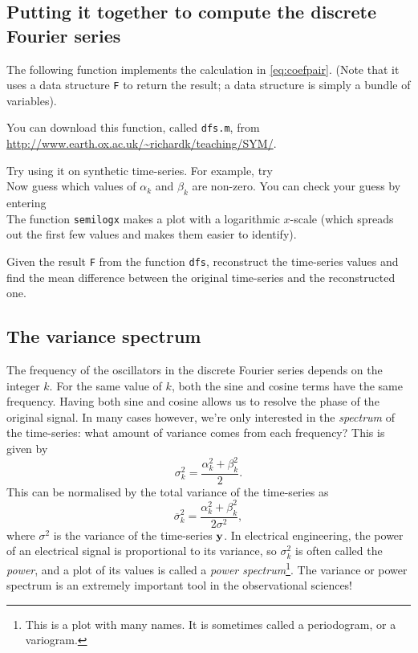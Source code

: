 \documentclass[11pt,twoside,a4paper]{article}
\begin{document}
\subsection{Putting it together to compute the discrete Fourier series}

The following \Mlab function implements the calculation in
\autoref{eq:coefpair}.  (Note that it uses a data structure \texttt{F}
to return the result; a data structure is simply a bundle of
variables).



You can download this function, called \texttt{dfs.m}, from 
\url{http://www.earth.ox.ac.uk/~richardk/teaching/SYM/}.

Try using it on synthetic time-series.  For example, try
\\
Now guess which values of $\alpha_k$ and $\beta_k$ are non-zero. You
can check your guess by entering
\\
The function \texttt{semilogx} makes a plot with a logarithmic
$x$-scale (which spreads out the first few values and makes
them easier to identify). 

\question Given the result \texttt{F} from the function \texttt{dfs},
reconstruct the time-series values and find the mean difference
between the original time-series and the reconstructed one.

\subsection{The variance spectrum}

The frequency of the oscillators in the discrete Fourier series
depends on the integer $k$. For the same value of $k$, both the sine
and cosine terms have the same frequency.  Having both sine and cosine
allows us to resolve the phase of the original signal.  In many cases
however, we're only interested in the \textit{spectrum} of the
time-series: what amount of variance comes from each frequency? This
is given by
\begin{displaymath}
  \sigma_k^2 = \frac{\alpha_k^2+\beta_k^2}{2}.
\end{displaymath}
This can be normalised by the total variance of the time-series as 
\begin{equation}
  \label{eq:varnormed}
  \overline{\sigma}_k^2 = \frac{\alpha_k^2+\beta_k^2}{2\sigma^2},
\end{equation}
where $\sigma^2$ is the variance of the time-series $\mbox{{\bf y}}$.  In
electrical engineering, the power of an electrical signal is
proportional to its variance, so $\sigma_k^2$ is often called the
\textit{power}, and a plot of its values is called a \textit{power
  spectrum}\footnote{This is a plot with many names.  It is sometimes
  called a periodogram, or a variogram.}.  The variance or power
spectrum is an extremely important tool in the observational sciences!
\end{document}
